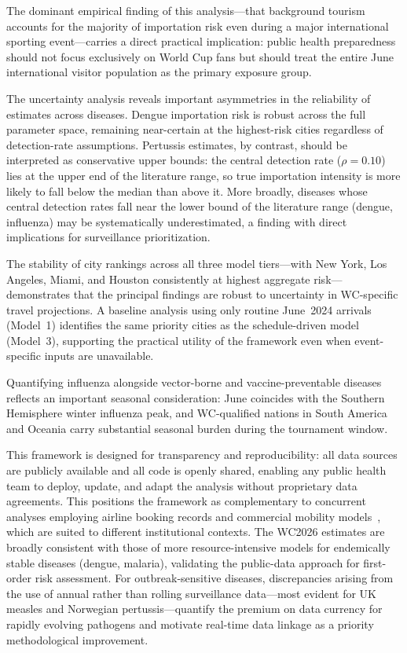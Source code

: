 \documentclass[12pt]{article}
\begin{document}
The dominant empirical finding of this analysis---that background tourism
accounts for the majority of importation risk even during a major
international sporting event---carries a direct practical implication:
public health preparedness should not focus exclusively on World Cup fans
but should treat the entire June international visitor population as the
primary exposure group.

The uncertainty analysis reveals important asymmetries in the reliability of
estimates across diseases. Dengue importation risk is robust across the full
parameter space, remaining near-certain at the highest-risk cities regardless
of detection-rate assumptions. Pertussis estimates, by contrast, should be
interpreted as conservative upper bounds: the central detection rate
($\rho = 0.10$) lies at the upper end of the literature range, so true
importation intensity is more likely to fall below the median than above it.
More broadly, diseases whose central detection rates fall near the lower bound
of the literature range (dengue, influenza) may be systematically
underestimated, a finding with direct implications for surveillance
prioritization.

The stability of city rankings across all three model tiers---with New
York, Los Angeles, Miami, and Houston consistently at highest aggregate
risk---demonstrates that the principal findings are robust to uncertainty
in WC-specific travel projections. A baseline analysis using only routine
June~2024 arrivals (Model~1) identifies the same priority cities as the
schedule-driven model (Model~3), supporting the practical utility of the
framework even when event-specific inputs are unavailable.

Quantifying influenza alongside vector-borne and vaccine-preventable
diseases reflects an important seasonal consideration: June coincides
with the Southern Hemisphere winter influenza peak, and WC-qualified
nations in South America and Oceania carry substantial seasonal burden
during the tournament window.

This framework is designed for transparency and reproducibility: all data
sources are publicly available and all code is openly shared, enabling
any public health team to deploy, update, and adapt the analysis without
proprietary data agreements. This positions the framework as
complementary to concurrent analyses employing airline booking records
and commercial mobility models~\cite{epistorm2026}, which are suited to
different institutional contexts. The WC2026 estimates are broadly
consistent with those of more resource-intensive models for endemically
stable diseases (dengue, malaria), validating the public-data approach
for first-order risk assessment. For outbreak-sensitive diseases,
discrepancies arising from the use of annual rather than rolling
surveillance data---most evident for UK measles and Norwegian
pertussis---quantify the premium on data currency for rapidly evolving
pathogens and motivate real-time data linkage as a priority
methodological improvement.
\end{document}
